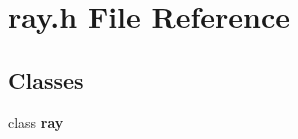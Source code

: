 \section{ray.h File Reference}
\label{ray_8h}
\subsection*{Classes}
\begin{CompactItemize}
\item 
class {\bf ray}
\end{CompactItemize}
